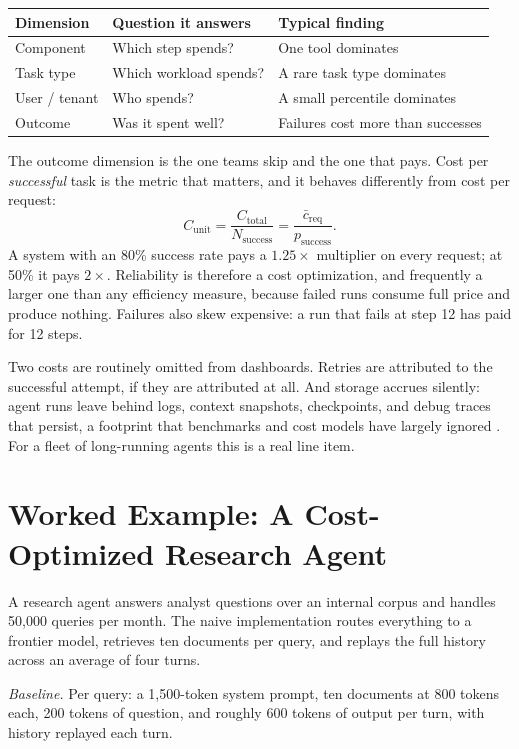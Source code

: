 \documentclass[11pt]{book}
\begin{document}
\begin{center}
\begin{tabular}{lll}
\toprule
Dimension & Question it answers & Typical finding \\
\midrule
Component & Which step spends? & One tool dominates \\
Task type & Which workload spends? & A rare task type dominates \\
User / tenant & Who spends? & A small percentile dominates \\
Outcome & Was it spent well? & Failures cost more than successes \\
\bottomrule
\end{tabular}
\end{center}

The outcome dimension is the one teams skip and the one that pays. Cost per \textit{successful} task is the metric that matters, and it behaves differently from cost per request:
\[
C_{\text{unit}} = \frac{C_{\text{total}}}{N_{\text{success}}} = \frac{\bar{c}_{\text{req}}}{p_{\text{success}}}.
\]
A system with an 80\% success rate pays a $1.25\times$ multiplier on every request; at 50\% it pays $2\times$. Reliability is therefore a cost optimization, and frequently a larger one than any efficiency measure, because failed runs consume full price and produce nothing. Failures also skew expensive: a run that fails at step 12 has paid for 12 steps.

Two costs are routinely omitted from dashboards. Retries are attributed to the successful attempt, if they are attributed at all. And storage accrues silently: agent runs leave behind logs, context snapshots, checkpoints, and debug traces that persist, a footprint that benchmarks and cost models have largely ignored \cite{footprint2026}. For a fleet of long-running agents this is a real line item.

\section{Worked Example: A Cost-Optimized Research Agent}

A research agent answers analyst questions over an internal corpus and handles 50{,}000 queries per month. The naive implementation routes everything to a frontier model, retrieves ten documents per query, and replays the full history across an average of four turns.

\textit{Baseline.} Per query: a 1{,}500-token system prompt, ten documents at 800 tokens each, 200 tokens of question, and roughly 600 tokens of output per turn, with history replayed each turn.
\end{document}
